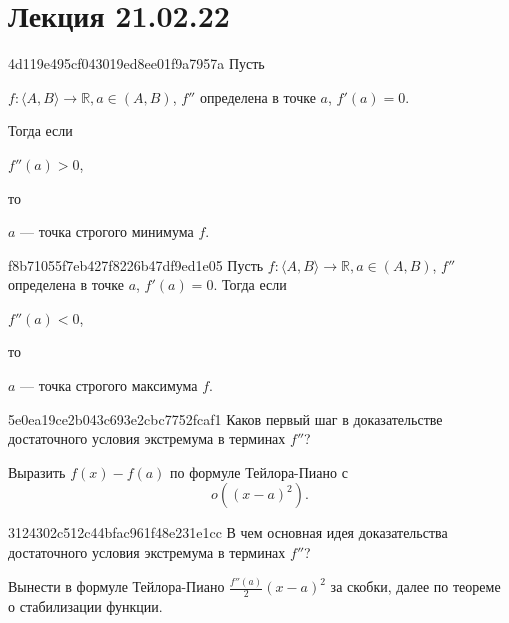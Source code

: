 \section{Лекция 21.02.22}
\begin{note}{4d119e495cf043019ed8ee01f9a7957a}
    Пусть \begin{icloze}{3}\( f : \langle A, B \rangle \to \mathbb R, a \in (A, B) \), \( f'' \) определена в точке \( a \), \( f'(a) = 0 \).\end{icloze}
    Тогда если \begin{icloze}{1}\( f''(a) > 0 \),\end{icloze} то \begin{icloze}{2}\( a \) --- точка строгого минимума \( f \).\end{icloze}
\end{note}

\begin{note}{f8b71055f7eb427f8226b47df9ed1e05}
    Пусть \( f : \langle A, B \rangle \to \mathbb R, a \in (A, B) \), \( f'' \) определена в точке \( a \), \( f'(a) = 0 \).
    Тогда если \begin{icloze}{1}\( f''(a) < 0 \),\end{icloze} то \begin{icloze}{2}\( a \) --- точка строгого максимума \( f \).\end{icloze}
\end{note}

\begin{note}{5e0ea19ce2b043c693e2cbc7752fcaf1}
    Каков первый шаг в доказательстве достаточного условия экстремума в терминах \( f'' \)?

    \begin{cloze}{1}
        Выразить \( f(x) - f(a) \)  по формуле Тейлора-Пиано с
        \[
            o((x - a)^2 ).
        \]
    \end{cloze}
\end{note}

\begin{note}{3124302c512c44bfac961f48e231e1cc}
    В чем основная идея доказательства достаточного условия экстремума в терминах \( f'' \)?

    \begin{cloze}{1}
        Вынести в формуле Тейлора-Пиано \( \frac{f''(a)}{2} (x - a)^2  \) за скобки, далее по теореме о стабилизации функции.
    \end{cloze}
\end{note}

